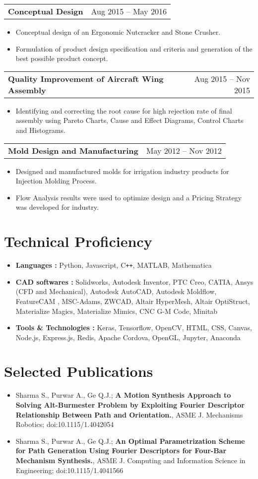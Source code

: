 \documentclass[letterpaper,10pt]{article}
\makeatletter
\newcommand{\resumeHeadingwithDate}[2]{
	\vspace{-1pt}
	\begin{tabular*}{0.97\textwidth}{l@{\extracolsep{\fill}}r}
		\textbf{#1} & #2 \vspace{-2pt}\\
	\end{tabular*}
	\vspace{+2pt}
}
\newcommand{\resumeSection}[1]{
\vspace{-12pt}
\section{\textbf{#1}}
}
\newcommand{\resumeItemListStart}{
\vspace{-7pt}
\begin{itemize}[leftmargin=14pt]
}
\newcommand{\resumeItemListEnd}{
\vspace{+7pt}
\end{itemize}
}
\newcommand{\resumeItem}[1]{
  \item\small{
      {#1 \vspace{-7pt}
      }
  }
}
\makeatother
\begin{document}
    \vspace{-4pt}
    \resumeHeadingwithDate{Conceptual Design}{Aug 2015 -- May 2016}
    \resumeItemListStart
    \resumeItem{Conceptual design of an Ergonomic Nutcracker and Stone Crusher.}
    \resumeItem{Formulation of product design specification and criteria and generation of the best possible product concept.}
    \resumeItemListEnd
    
    \vspace{-4pt}
    \resumeHeadingwithDate{Quality Improvement of Aircraft Wing Assembly}{Aug 2015 -- Nov 2015}
    \resumeItemListStart
    \resumeItem{Identifying and correcting the root cause for high rejection rate of final assembly using Pareto Charts, Cause and Effect Diagrams, Control Charts and Histograms.}
    \resumeItemListEnd
    
    \vspace{-4pt}
    \resumeHeadingwithDate{Mold Design and Manufacturing}{May 2012 -- Nov 2012}
    \resumeItemListStart
    \resumeItem{Designed and manufactured molds for irrigation industry products for Injection Molding Process.}
    \resumeItem{Flow Analysis results were used to optimize design and a Pricing Strategy was developed for industry.}
    \resumeItemListEnd
    
    
    
\resumeSection{Technical Proficiency}
    \vspace{+7pt}
    \resumeItemListStart
    \resumeItem{\textbf{Languages :} Python, Javascript, C\texttt{++}, MATLAB, Mathematica}
    \resumeItem{\textbf{CAD softwares :} Solidworks, Autodesk Inventor, PTC Creo, CATIA, Ansys (CFD and Mechanical), Autodesk AutoCAD, Autodesk Moldflow, FeatureCAM , MSC-Adams, ZWCAD, Altair HyperMesh, Altair OptiStruct, Materialize Magics, Materialize Mimics, CNC G-M Code, Minitab}
    \resumeItem{\textbf{Tools \& Technologies :} Keras, Tensorflow, OpenCV, HTML, CSS, Canvas, Node.js, Express.js, Redis, Apache Cordova, OpenGL, Jupyter, Anaconda}
    \resumeItemListEnd
    
    
    
\resumeSection{Selected Publications}
	\vspace{+7pt}
	\resumeItemListStart
	\resumeItem{Sharma S., Purwar A., Ge Q.J.; \textbf{A Motion Synthesis Approach to Solving Alt-Burmester Problem by Exploiting Fourier Descriptor Relationship Between Path and Orientation.}, ASME J. Mechanisms Robotics; doi:10.1115/1.4042054}
	\resumeItem{Sharma S., Purwar A., Ge Q.J.; \textbf{An Optimal Parametrization Scheme for Path Generation Using Fourier Descriptors for Four-Bar Mechanism Synthesis.}, ASME J. Computing and Information Science in Engineering; doi:10.1115/1.4041566}
	\resumeItemListEnd
\end{document}
